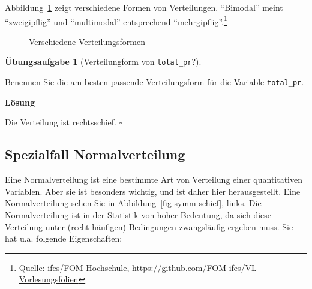 \documentclass[
  letterpaper,
  oneside,
  open=any]{scrbook}
\theoremstyle{definition}
\newtheorem{exercise}{Übungsaufgabe}[chapter]
\theoremstyle{definition}
\theoremstyle{definition}
\theoremstyle{remark}
\begin{document}
Abbildung~\ref{fig-plot-distribs} zeigt verschiedene Formen von
Verteilungen. \enquote{Bimodal} meint \enquote{zweigipflig} und
\enquote{multimodal} entsprechend \enquote{mehrgipflig}.\footnote{Quelle:
  ifes/FOM Hochschule,
  \url{https://github.com/FOM-ifes/VL-Vorlesungsfolien}}

\begin{figure}


\caption{\label{fig-plot-distribs}Verschiedene Verteilungsformen}

\end{figure}%

\begin{exercise}[Verteilungform von
\texttt{total\_pr}?]\protect\hypertarget{exr-verteilungsform-total-pr}{}\label{exr-verteilungsform-total-pr}

Benennen Sie die am besten passende Verteilungsform für die Variable
\texttt{total\_pr}.

\textbf{Lösung}

Die Verteilung ist rechtsschief. \(\square\)

\end{exercise}

\subsection{Spezialfall
Normalverteilung}\label{spezialfall-normalverteilung}

Eine Normalverteilung ist eine bestimmte Art von Verteilung einer
quantitativen Variablen. Aber sie ist besonders wichtig, und ist daher
hier herausgestellt. Eine Normalverteilung sehen Sie in
Abbildung~\ref{fig-symm-schief}, links. Die Normalverteilung ist in der
Statistik von hoher Bedeutung, da sich diese Verteilung unter (recht
häufigen) Bedingungen zwangsläufig ergeben muss. Sie hat u.a. folgende
Eigenschaften:
\end{document}
